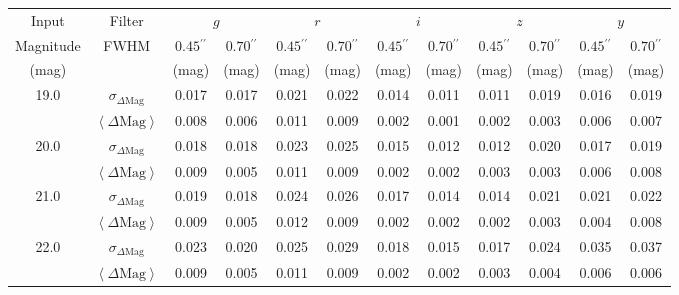 \documentclass[useamsfonts]{pasj01}
\def\asec{$^{\prime\prime}$}
\def\forced{\texttt{forced}}
\newcommand{\smag}{$\sigma_{\Delta\mathrm{Mag}}$}
\newcommand{\mmag}{$\left<{\Delta\mathrm{Mag}}\right>$}
\begin{document}
\begin{table}
    \begin{center}
    \begin{tabular}{| c | c | c | c | c | c | c | c | c | c | c | c |}
    \hline 
    \rowcolor[gray]{.85} \multicolumn{12}{|c|}{\large{Table}: Summary of \forced{} PSF Magnitude} \\
    \hline \hline 
    Input & Filter & \multicolumn{2}{|c|}{$g$} & \multicolumn{2}{|c|}{$r$} & \multicolumn{2}{|c|}{$i$} & \multicolumn{2}{|c|}{$z$} & \multicolumn{2}{|c|}{$y$} \\
    \cline{2-12}
    Magnitude & FWHM & $0.45$\asec{} & $0.70$\asec{} & $0.45$\asec{} & $0.70$\asec{} & $0.45$\asec{} & $0.70$\asec{} & $0.45$\asec{} & $0.70$\asec{} & $0.45$\asec{} & $0.70$\asec{} \\
    \hline
    (mag) & & (mag) & (mag) & (mag) & (mag) & (mag) & (mag) & (mag) & (mag) & (mag) & (mag) \\
    \hline
    
    \rowcolor[gray]{.85} 19.0 & \smag{} & 0.017 & 0.017  & 0.021 & 0.022 & 0.014 & 0.011 & 0.011 & 0.019 & 0.016 & 0.019 \\
    \rowcolor[gray]{.85}      & \mmag{} & 0.008 & 0.006  & 0.011 & 0.009 & 0.002 & 0.001 & 0.002 & 0.003 & 0.006 & 0.007 \\
    \hline
    
    \rowcolor[gray]{1.0} 20.0 & \smag{} & 0.018 & 0.018  & 0.023 & 0.025 & 0.015 & 0.012 & 0.012 & 0.020 & 0.017 & 0.019 \\
    \rowcolor[gray]{1.0}      & \mmag{} & 0.009 & 0.005  & 0.011 & 0.009 & 0.002 & 0.002 & 0.003 & 0.003 & 0.006 & 0.008 \\
    \hline
    
    \rowcolor[gray]{.85} 21.0 & \smag{} & 0.019 & 0.018  & 0.024 & 0.026 & 0.017 & 0.014 & 0.014 & 0.021 & 0.021 & 0.022 \\
    \rowcolor[gray]{.85}      & \mmag{} & 0.009 & 0.005  & 0.012 & 0.009 & 0.002 & 0.002 & 0.002 & 0.003 & 0.004 & 0.008 \\
    \hline 
    
    \rowcolor[gray]{1.0} 22.0 & \smag{} & 0.023 & 0.020  & 0.025 & 0.029 & 0.018 & 0.015 & 0.017 & 0.024 & 0.035 & 0.037 \\
    \rowcolor[gray]{1.0}      & \mmag{} & 0.009 & 0.005  & 0.011 & 0.009 & 0.002 & 0.002 & 0.003 & 0.004 & 0.006 & 0.006 \\
    \hline


\end{tabular}
\end{center}
\end{table}
\end{document}
